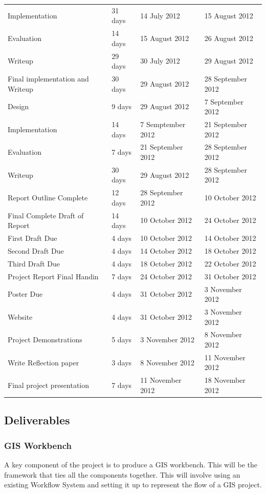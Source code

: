 \documentclass[12pt,a4paper]{article}
\begin{document}
\begin{tabular}{l||l|l|l}
    \indent Implementation & 31 days & 14 July 2012 & 15 August 2012 \\
    \indent Evaluation & 14 days & 15 August 2012 & 26 August 2012  \\
    \indent Writeup & 29 days & 30 July 2012 & 29 August 2012 \\
    \hline
    Final implementation and Writeup & 30 days & 29 August 2012 & 28 September 2012 \\
    \indent Design & 9 days   & 29 August 2012  & 7 September 2012 \\
    \indent Implementation & 14 days & 7 Semptember 2012 & 21 September 2012 \\
    \indent Evaluation & 7 days & 21 September 2012  & 28 September 2012 \\
    \indent Writeup & 30 days & 29 August 2012 & 28 September 2012 \\
    \hline
    Report Outline Complete & 12 days  &28 September 2012 & 10 October 2012 \\
    \hline
    Final Complete Draft of Report & 14 days & 10 October 2012 & 24 October 2012 \\
    \indent First Draft Due & 4 days &10 October 2012 & 14 October 2012 \\
    \indent Second Draft Due & 4 days &14 October 2012 & 18 October 2012 \\
    \indent Third Draft Due & 4 days  &18 October 2012 & 22 October 2012 \\
    \hline
    Project Report Final Handin & 7 days & 24 October 2012 & 31 October 2012 \\
    \hline
    Poster Due & 4 days  & 31 October 2012 & 3 November 2012 \\
    \hline
    Website & 4 days & 31 October 2012 & 3 November 2012 \\
    \hline
    Project Demonstrations & 5 days & 3 November 2012 & 8 November 2012 \\
    \hline
    Write Reflection paper &3 days & 8 November 2012 & 11 November 2012 \\
    \hline
    Final project presentation & 7 days &11 November 2012 & 18 November 2012 \\

\end{tabular}
\subsection{Deliverables}
\subsubsection*{GIS Workbench}
A key component of the project is to produce a GIS workbench. This will
be the framework that ties all the components together. This will involve
using an existing Workflow System and setting it up to represent the
flow of a GIS project.
\end{document}
